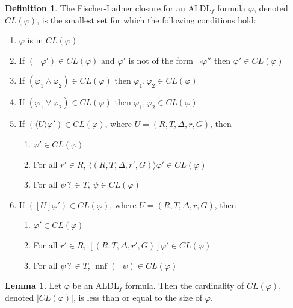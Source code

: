 \documentclass[10pt,a4paper]{amsart}
\theoremstyle{plain}
\theoremstyle{definition}
\newtheorem{lemma}[thm]{Lemma}
\newtheorem{definition}[thm]{Definition}
\theoremstyle{definition}
\newcommand{\dbox}[1]{\langle #1 \rangle}
\newcommand{\bbox}[1]{[ #1 ]}
\DeclareMathOperator{\nnf}{nnf}
\DeclareMathOperator{\?}{?}
\begin{document}
\begin{definition}
    The Fischer-Ladner closure for an ALDL$_f$ formula $\varphi$, denoted $CL(\varphi)$, is the smallest set for which
    the following conditions hold:
\begin{enumerate}
    \item $\varphi$ is in $CL(\varphi)$
    \item If $(\neg\varphi') \in CL(\varphi)$ and $\varphi'$ is not of the form $\neg\varphi''$ then $\varphi' \in CL(\varphi)$
    \item If $(\varphi_1 \wedge \varphi_2) \in CL(\varphi)$ then $\varphi_1,\varphi_2 \in CL(\varphi)$
    \item If $(\varphi_1 \vee \varphi_2) \in CL(\varphi)$ then $\varphi_1,\varphi_2 \in CL(\varphi)$
    \item If $(\dbox{U}\varphi') \in CL(\varphi)$,
    where $U = (R,T,\Delta,r,G)$, then
    \begin{enumerate}[label=(\roman*)]
        \item $\varphi' \in CL(\varphi)$
        \item For all $r' \in R$, $\dbox{(R,T,\Delta,r',G)}\varphi' \in CL(\varphi)$
        \item For all $\psi\? \in T$, $\psi \in CL(\varphi)$
    \end{enumerate}
    \item If $(\bbox{U}\varphi') \in CL(\varphi)$, where $U = (R,T,\Delta,r,G)$, then
    \begin{enumerate}[label=(\roman*)]
        \item $\varphi' \in CL(\varphi)$
        \item For all $r' \in R$, $\bbox{(R,T,\Delta,r',G)}\varphi' \in CL(\varphi)$
        \item For all $\psi\? \in T$, $\nnf(\neg\psi) \in CL(\varphi)$
    \end{enumerate}

\end{enumerate}
\end{definition}

\begin{lemma}

  Let $\varphi$ be an ALDL$_f$ formula. Then the cardinality of $CL(\varphi)$, denoted $|CL(\varphi)|$, is less than or equal to the size of $\varphi$.

\end{lemma}
\end{document}

